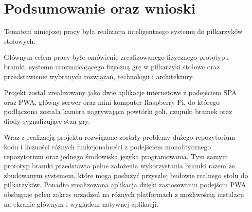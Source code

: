 \chapter{Podsumowanie oraz wnioski}
\label{ch:podsumowanie}

Tematem niniejszej pracy była realizacja inteligentnego systemu do piłkarzyków stołowych.

Głównym celem pracy było omówienie zrealizowanego fizycznego prototypu bramki, systemu urozmaicającego fizyczną grę w piłkarzyki stołowe oraz przedstawienie wybranych rozwiązań, technologii i architektury.

Projekt został zrealizowany jako dwie aplikacje internetowe z podejściem SPA oraz PWA, główny serwer oraz mini komputer Raspberry Pi, do którego podłączona została kamera nagrywająca powtórki goli, czujniki bramek oraz diody sygnalizujące stan gry.

Wraz z realizacją projektu rozwiązane zostały problemy dużego repozytorium kodu i liczności różnych funkcjonalności z podejściem monolitycznego repozytorium oraz jednego środowiska języka programowania. Tym samym prototyp bramki przedstawia pełne założenia wykorzystania bramki razem ze zbudowanym systemem, które mogą posłużyć przyszłej budowie realnego stołu do piłkarzyków. Ponadto zrealizowana aplikacja dzięki zastosowaniu podejściu PWA obsługuje pełen zakres urządzeń na różnych platformach z możliwością instalacji na ekranie głównym i wyglądem natywnej aplikacji.